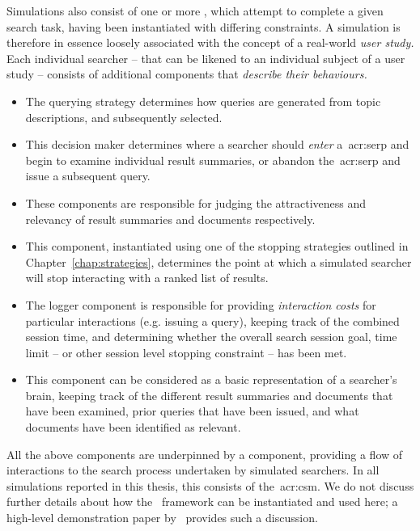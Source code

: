 Simulations also consist of one or more , which attempt to complete a given search task, having been instantiated with differing constraints. A simulation is therefore in essence loosely associated with the concept of a real-world \emph{user study.} Each individual searcher -- that can be likened to an individual subject of a user study -- consists of additional components that \emph{describe their behaviours.}

\begin{itemize}
    \item{ The querying strategy determines how queries are generated from topic descriptions, and subsequently selected.}
    \item{ This decision maker determines where a searcher should \emph{enter} a~\gls{acr:serp} and begin to examine individual result summaries, or abandon the~\gls{acr:serp} and issue a subsequent query.}
    \item{ These components are responsible for judging the attractiveness and relevancy of result summaries and documents respectively.}
    \item{ This component, instantiated using one of the stopping strategies outlined in Chapter~\ref{chap:strategies}, determines the point at which a simulated searcher will stop interacting with a ranked list of results.}
    \item{ The logger component is responsible for providing \emph{interaction costs} for particular interactions (e.g. issuing a query), keeping track of the combined session time, and determining whether the overall search session goal, time limit -- or other session level stopping constraint -- has been met.}
    \item{ This component can be considered as a basic representation of a searcher's brain, keeping track of the different result summaries and documents that have been examined, prior queries that have been issued, and what documents have been identified as relevant.}
\end{itemize}

All the above components are underpinned by a  component, providing a flow of interactions to the search process undertaken by simulated searchers. In all simulations reported in this thesis, this consists of the~\gls{acr:csm}. We do not discuss further details about how the \simiir~framework can be instantiated and used here; a high-level demonstration paper by~\cite{maxwell2016simiir} provides such a discussion.

